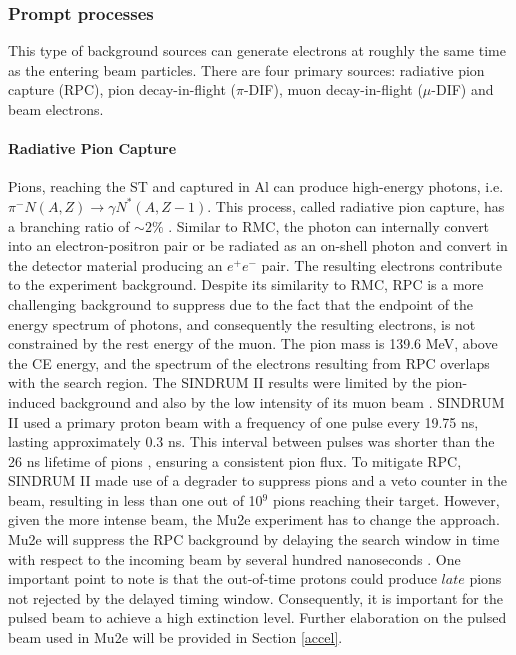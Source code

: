 \subsubsection{Prompt processes}
This type of background sources can generate electrons at roughly the same time as 
the entering beam particles. There are four primary sources: radiative pion capture (RPC), 
pion decay-in-flight ($\pi$-DIF), muon decay-in-flight ($\mu$-DIF) and beam electrons.

\paragraph{Radiative Pion Capture}

Pions, reaching the ST and captured in Al can 
produce high-energy photons, i.e. $\pi^- N(A,Z) \rightarrow \gamma N ^* (A,Z-1)$. 
This process, called radiative pion capture,
has a branching ratio of $\sim 2\%$ \cite{PhysRevC.5.1867}.
Similar to RMC, the photon 
can internally convert into an electron-positron pair or be radiated as an on-shell photon 
and convert in the detector material producing an $e^+e^-$ pair. 
The resulting electrons contribute to the experiment background. 
Despite its similarity to RMC, RPC is a more challenging background to suppress due to 
the fact that the endpoint of the energy spectrum of photons, and consequently the 
resulting electrons, is not constrained by the rest energy of the muon.
The pion mass is 139.6 MeV, above the CE energy,
and the spectrum of the electrons resulting from RPC overlaps with the search region. 
The SINDRUM II results 
were limited by the pion-induced background and also by the low intensity of its muon 
beam \cite{SINDRUMII:2006dvw}. SINDRUM II used a primary proton beam with a 
frequency of one pulse every 19.75 ns, lasting approximately 0.3 ns. This interval 
between pulses was shorter than the 26 ns lifetime of pions \cite{zyla}, 
ensuring a consistent pion flux. To mitigate RPC, SINDRUM II made use of a degrader to suppress 
pions and a veto counter in the beam, resulting in less than one out of 10$^9$ pions reaching their 
target. However, given the more intense beam, the Mu2e experiment has to change the approach. 
Mu2e will suppress the RPC background by delaying the search window in time with respect
to the incoming beam by several hundred nanoseconds \cite{universe9010054}. 
One important point to note is that the out-of-time protons could produce $late$ pions not rejected by the delayed timing window. 
Consequently, it is important for the pulsed beam to achieve a high extinction level. Further elaboration 
on the pulsed beam used in Mu2e will be provided in Section \ref{accel}.
